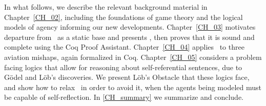  

In what follows, we describe the relevant background material in Chapter~\ref{CH_02}, including the foundations of game theory and the logical models of agency informing our new developments. Chapter~\ref{CH_03} motivates departure from \SFive\ as a static base and presents \DASL, then proves that it is sound and complete using the Coq Proof Assistant. Chapter~\ref{CH_04} applies \DASL\ to three aviation mishaps, again formalized in Coq. Chapter~\ref{CH_05} considers a problem facing logics that allow for reasoning about self-referential sentences, due to G\"odel and L\"ob's discoveries. We present L\"ob's Obstacle that these logics face, and show how to relax \DASL\ in order to avoid it, when the agents being modeled must be capable of self-reflection. In \ref{CH_summary} we summarize and conclude.
